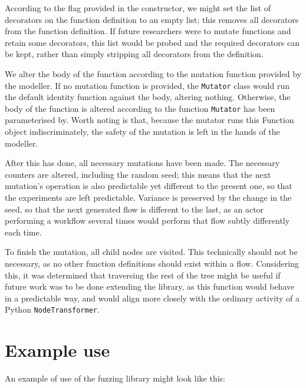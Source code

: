 According to the flag provided in the constructor, we might set the list of decorators on the function definition to an empty list; this removes all decorators from the function definition. If future researchers were to mutate functions and retain some decorators, this list would be probed and the required decorators can be kept, rather than simply stripping all decorators from the definition. \par

We alter the body of the function according to the mutation function provided by the modeller. If no mutation function is provided, the \texttt{Mutator} class would run the default identity function against the body, altering nothing. Otherwise, the body of the function is altered according to the function \texttt{Mutator} has been parameterised by. Worth noting is that, because the mutator runs this Function object indiscriminately, the safety of the mutation is left in the hands of the modeller. \par

After this has done, all necessary mutations have been made. The necessary counters are altered, including the random seed; this means that the next mutation's operation is also predictable yet different to the present one, so that the experiments are left predictable. Variance is preserved by the change in the seed, so that the next generated flow is different to the last, as an actor performing a workflow several times would perform that flow subtly differently each time. \par

To finish the mutation, all child nodes are visited. This technically should not be necessary, as no other function definitions should exist within a flow. Considering this, it was determined that traversing the rest of the tree might be useful if future work was to be done extending the library, as this function would behave in a predictable way, and would align more closely with the ordinary activity of a Python \texttt{NodeTransformer}. \par

\section{Example use}
\label{fuzzing_implementation_example}
An example of use of the fuzzing library might look like this:

